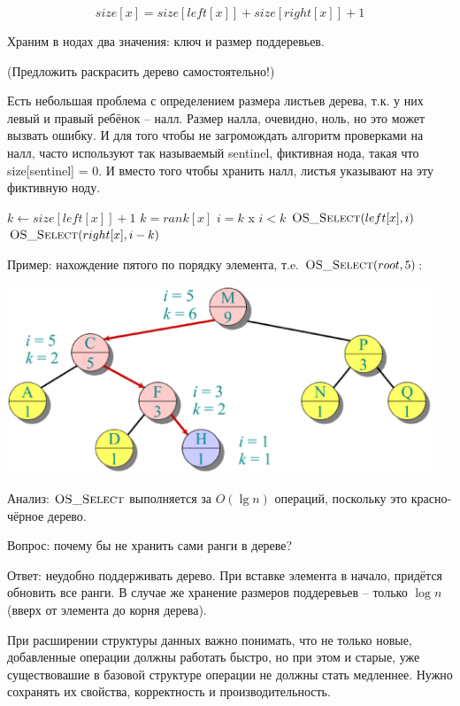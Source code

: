 \documentclass[a4paper,11pt]{article}
\begin{document}
$$
size[x] = size[left[x]] + size[right[x]] + 1
$$

Храним в нодах два значения: ключ и размер поддеревьев.

(Предложить раскрасить дерево самостоятельно!)

Есть небольшая проблема с определением размера листьев дерева, т.к. у них левый
и правый ребёнок -- налл. Размер налла, очевидно, ноль, но это может вызвать
ошибку. И для того чтобы не загромождать алгоритм проверками на налл, часто
используют так называемый sentinel, фиктивная нода, такая что size[sentinel] = 0. И
вместо того чтобы хранить налл, листья указывают на эту фиктивную ноду.

\begin{codebox}
\li $k \gets size[left[x]] + 1$ \Comment $k = rank[x]$
\li \If $i = k$
\li \Then \Return x
    \End
\li \If $i < k$
\li \Then \Return $\textnormal{\scshape OS\_Select}(left[x], i)$
\li \Else \Return $\textnormal{\scshape OS\_Select}(right[x], i - k)$
    \End
\end{codebox}

Пример: нахождение пятого по порядку элемента, т.e. $\textnormal{\scshape OS\_Select}(root, 5)$:

\begin{center}
\includegraphics[width=5in]{lecture11/tree2.eps}
\end{center}

Анализ: $\textnormal{\scshape OS\_Select}$ выполняется за $O(\lg n)$ операций, поскольку это
красно-чёрное дерево.

Вопрос: почему бы не хранить сами ранги в дереве?

Ответ: неудобно поддерживать дерево. При вставке элемента в начало, придётся
обновить все ранги. В случае же хранение размеров поддеревьев -- только $\log n$
(вверх от элемента до корня дерева).

При расширении структуры данных важно понимать, что не только новые, добавленные
операции должны работать быстро, но при этом и старые, уже существовашие в
базовой структуре операции не должны стать медленнее. Нужно сохранять их
свойства, корректность и производительность.
\end{document}
